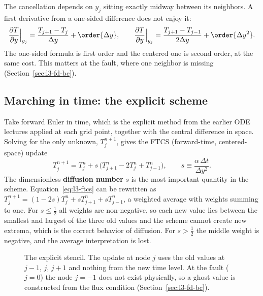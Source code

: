 The cancellation depends on $y_j$ sitting exactly midway between its neighbors. A first derivative from a one-sided difference does not enjoy it:
\begin{equation}
\frac{\partial T}{\partial y}\Big|_{y_j}=\frac{T_{j+1}-T_j}{\Delta y}+\order{\Delta y},\qquad
\frac{\partial T}{\partial y}\Big|_{y_j}=\frac{T_{j+1}-T_{j-1}}{2\Delta y}+\order{\Delta y^2}.
\label{eq:l3-first}
\end{equation}
The one-sided formula is first order and the centered one is second order, at the same cost. This matters at the fault, where one neighbor is missing (Section~\ref{sec:l3-fd-bc}).

\subsection{Marching in time: the explicit scheme}
\label{sec:l3-fd-time}

Take forward Euler in time, which is the explicit method from the earlier ODE lectures applied at each grid point, together with the central difference in space. Solving for the only unknown, $T_j^{n+1}$, gives the FTCS (forward-time, centered-space) update
\begin{equation}
T_j^{n+1}=T_j^n+s\,\big(T_{j+1}^n-2T_j^n+T_{j-1}^n\big),\qquad s\equiv\frac{\alpha\,\Delta t}{\Delta y^2}.
\label{eq:l3-ftcs}
\end{equation}
The dimensionless \textbf{diffusion number} $s$ is the most important quantity in the scheme. Equation~\eqref{eq:l3-ftcs} can be rewritten as $T_j^{n+1}=(1-2s)T_j^n+sT_{j+1}^n+sT_{j-1}^n$, a weighted average with weights summing to one. For $s\le\tfrac12$ all weights are non-negative, so each new value lies between the smallest and largest of the three old values and the scheme cannot create new extrema, which is the correct behavior of diffusion. For $s>\tfrac12$ the middle weight is negative, and the average interpretation is lost.

\begin{figure}[ht]
\centering
{}
\caption{The explicit stencil. The update at node $j$ uses the old values at $j-1$, $j$, $j+1$ and nothing from the new time level. At the fault ($j=0$) the node $j=-1$ does not exist physically, so a ghost value is constructed from the flux condition (Section~\ref{sec:l3-fd-bc}).}
\label{fig:l3-stencil}
\end{figure}

